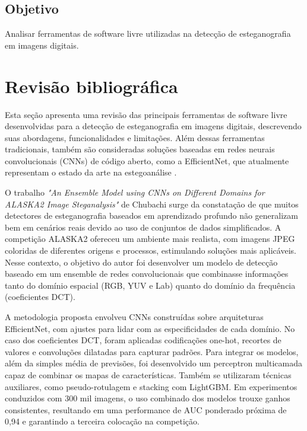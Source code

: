 \documentclass[12pt]{article}
\begin{document}
\subsection{Objetivo}

Analisar ferramentas de software livre utilizadas na detecção de esteganografia
em imagens digitais.

\section{Revisão bibliográfica} \label{sec:firstpage}
Esta seção apresenta uma revisão das principais ferramentas de software livre
desenvolvidas para a detecção de esteganografia em imagens digitais,
descrevendo suas abordagens, funcionalidades e limitações. Além dessas
ferramentas tradicionais, também são consideradas soluções baseadas em redes
neurais convolucionais (CNNs) de código aberto, como a EfficientNet, que
atualmente representam o estado da arte na estegoanálise
\cite{LaCroix2024survey}.


O trabalho \textit{"An Ensemble Model using CNNs on Different Domains for
  ALASKA2 Image Steganalysis"} de Chubachi \cite{chubachi2020cnn} surge da
constatação de que muitos detectores de esteganografia baseados em aprendizado
profundo não generalizam bem em cenários reais devido ao uso de conjuntos de
dados simplificados. A competição ALASKA2 ofereceu um ambiente mais realista,
com imagens JPEG coloridas de diferentes origens e processos, estimulando
soluções mais aplicáveis. Nesse contexto, o objetivo do autor foi desenvolver
um modelo de detecção baseado em um ensemble de redes convolucionais que
combinasse informações tanto do domínio espacial (RGB, YUV e Lab) quanto do
domínio da frequência (coeficientes DCT).

A metodologia proposta envolveu CNNs construídas sobre arquiteturas
EfficientNet, com ajustes para lidar com as especificidades de cada domínio. No
caso dos coeficientes DCT, foram aplicadas codificações one-hot, recortes de
valores e convoluções dilatadas para capturar padrões. Para integrar os
modelos, além da simples média de previsões, foi desenvolvido um perceptron
multicamada capaz de combinar os mapas de características. Também se utilizaram
técnicas auxiliares, como pseudo-rotulagem e stacking com LightGBM. Em
experimentos conduzidos com 300 mil imagens, o uso combinado dos modelos trouxe
ganhos consistentes, resultando em uma performance de AUC ponderado próxima de
0,94 e garantindo a terceira colocação na competição.
\end{document}
